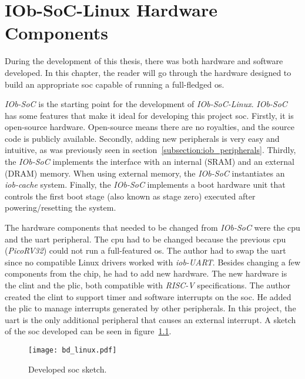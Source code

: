 \chapter{IOb-SoC-Linux Hardware Components}
\label{chapter:hardware_developed}
During the development of this thesis, there was both hardware and software developed. In this chapter, the reader will go through the hardware designed to build an appropriate \acrfull{soc} capable of running a full-fledged \acrfull{os}.

\textit{IOb-SoC} is the starting point for the development of \textit{IOb-SoC-Linux}. \textit{IOb-SoC} has some features that make it ideal for developing this project \acrshort{soc}. Firstly, it is open-source hardware. Open-source means there are no royalties, and the source code is publicly available. Secondly, adding new peripherals is very easy and intuitive, as was previously seen in section~\ref{subsection:iob_peripherals}. Thirdly, the \textit{IOb-SoC} implements the interface with an internal (SRAM) and an external (DRAM) memory. When using external memory, the \textit{IOb-SoC} instantiates an \textit{iob-cache} system. Finally, the \textit{IOb-SoC} implements a boot hardware unit that controls the first boot stage (also known as stage zero) executed after powering/resetting the system.

The hardware components that needed to be changed from \textit{IOb-SoC} were the \acrfull{cpu} and the \acrfull{uart} peripheral. The \acrshort{cpu} had to be changed because the previous \acrshort{cpu} (\textit{PicoRV32}) could not run a full-featured \acrlong{os}. The author had to swap the \acrshort{uart} since no compatible Linux drivers worked with \textit{iob-UART}. Besides changing a few components from the chip, he had to add new hardware. The new hardware is the \acrshort{clint} and the \acrshort{plic}, both compatible with \textit{RISC-V} specifications. The author created the \acrshort{clint} to support timer and software interrupts on the \acrshort{soc}. He added the \acrshort{plic} to manage interrupts generated by other peripherals. In this project, the \acrshort{uart} is the only additional peripheral that causes an external interrupt. A sketch of the \acrshort{soc} developed can be seen in figure~\ref{fig:bd_linux}.

\begin{figure}[!h]
    \centering
    \texttt{[image: bd\_linux.pdf]}
    \caption{Developed \acrshort{soc} sketch.}
    \label{fig:bd_linux}
\end{figure}

